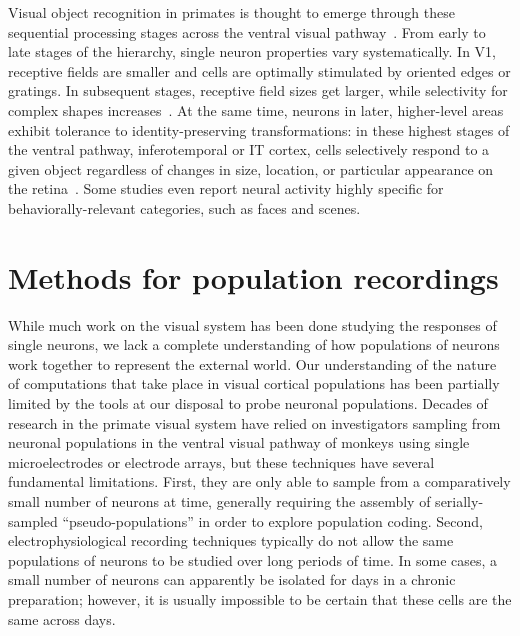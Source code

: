 Visual object recognition in primates is thought to emerge through these sequential processing stages across the ventral visual pathway~\cite{Rust2010SelectivityIT, DiCarlo2007, DiCarlo2012}. From early to late stages of the hierarchy, single neuron properties vary systematically. In V1, receptive fields are smaller and cells are optimally stimulated by oriented edges or gratings\cite{Hubel1968}. In subsequent stages, receptive field sizes get larger, while selectivity for complex shapes increases~\cite{Desimone1984, Logothetis1996}. At the same time, neurons in later, higher-level areas exhibit tolerance to identity-preserving transformations: in these highest stages of the ventral pathway, inferotemporal or IT cortex, cells selectively respond to a given object regardless of changes in size, location, or particular appearance on the retina~\cite{Tanaka1996, DiCarlo2012}. Some studies even report neural activity highly specific for behaviorally-relevant categories, such as faces\cite{Kanwisher1997, Tsao2006} and scenes\cite{Epstein1998}.

\section{Methods for population recordings}
While much work on the visual system has been done studying the responses of single neurons, we lack a complete understanding of how populations of neurons work together to represent the external world. Our understanding of the nature of computations that take place in visual cortical populations has been partially limited by the tools at our disposal to probe neuronal populations. Decades of research in the primate visual system have relied on investigators sampling from neuronal populations in the ventral visual pathway of monkeys using single microelectrodes or electrode arrays, but these techniques have several fundamental limitations. First, they are only able to sample from a comparatively small number of neurons at time, generally requiring the assembly of serially-sampled ``pseudo-populations'' in order to explore population coding. Second, electrophysiological recording techniques typically do not allow the same populations of neurons to be studied over long periods of time. In some cases, a small number of neurons can apparently be isolated for days in a chronic preparation; however, it is usually impossible to be certain that these cells are the same across days. 

